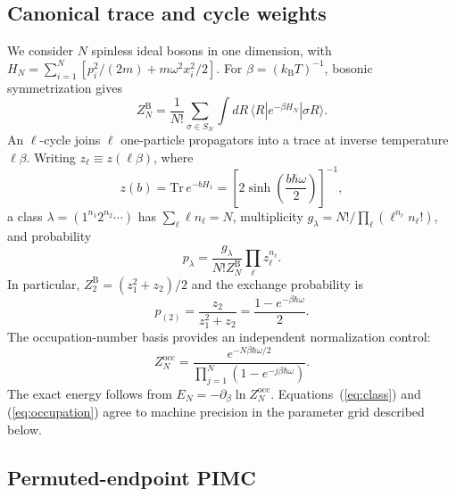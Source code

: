\documentclass[aps,pra,reprint,floatfix,amsmath,amssymb,groupedaddress]{revtex4-2}
\begin{document}
\subsection{Canonical trace and cycle weights}

We consider $N$ spinless ideal bosons in one dimension, with $H_N=\sum_{i=1}^{N}[p_i^2/(2m)+m\omega^2x_i^2/2]$. For $\beta=(k_{\mathrm B}T)^{-1}$, bosonic symmetrization gives
\begin{equation}
Z_N^{\mathrm B}=\frac{1}{N!}\sum_{\sigma\in S_N}\int dR\,
\langle R|e^{-\beta H_N}|\sigma R\rangle .
\label{eq:trace}
\end{equation}
An $\ell$-cycle joins $\ell$ one-particle propagators into a trace at inverse temperature $\ell\beta$. Writing $z_\ell\equiv z(\ell\beta)$, where
\begin{equation}
z(b)=\mathrm{Tr}\,e^{-bH_1}
=\left[2\sinh\!\left(\frac{b\hbar\omega}{2}\right)\right]^{-1},
\label{eq:z1}
\end{equation}
a class $\lambda=(1^{n_1}2^{n_2}\cdots)$ has $\sum_\ell\ell n_\ell=N$, multiplicity $g_\lambda=N!/\prod_\ell(\ell^{n_\ell}n_\ell!)$, and probability
\begin{equation}
p_\lambda=\frac{g_\lambda}{N!Z_N^{\mathrm B}}
\prod_\ell z_\ell^{n_\ell}.
\label{eq:class}
\end{equation}
In particular, $Z_2^{\mathrm B}=(z_1^2+z_2)/2$ and the exchange probability is
\begin{equation}
p_{(2)}=\frac{z_2}{z_1^2+z_2}
=\frac{1-e^{-\beta\hbar\omega}}{2}.
\label{eq:exchange2}
\end{equation}
The occupation-number basis provides an independent normalization control:
\begin{equation}
Z_N^{\mathrm{occ}}=
\frac{e^{-N\beta\hbar\omega/2}}
{\prod_{j=1}^{N}(1-e^{-j\beta\hbar\omega})}.
\label{eq:occupation}
\end{equation}
The exact energy follows from $E_N=-\partial_\beta\ln Z_N^{\mathrm{occ}}$. Equations~(\ref{eq:class}) and (\ref{eq:occupation}) agree to machine precision in the parameter grid described below.

\subsection{Permuted-endpoint PIMC}
\end{document}
